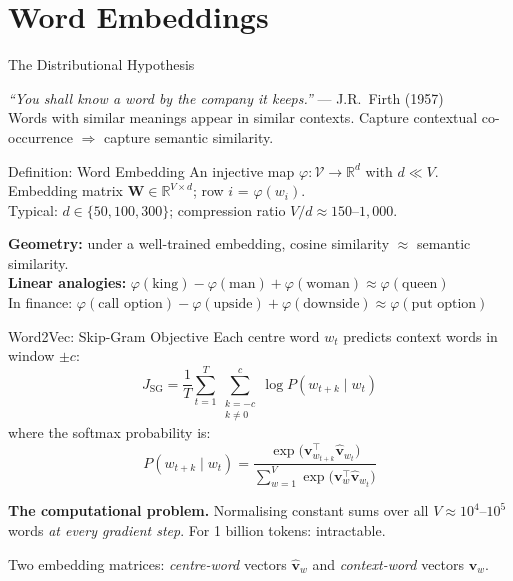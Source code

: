 \documentclass[9pt,t]{beamer}
\begin{document}
\section{Word Embeddings}

\begin{frame}{The Distributional Hypothesis}
  \begin{bigpicture}
    \emph{``You shall know a word by the company it keeps.''} --- J.R.\ Firth (1957)\\[2pt]
    Words with similar meanings appear in similar contexts.
    Capture contextual co-occurrence $\Rightarrow$ capture semantic similarity.
  \end{bigpicture}
  \medskip
  \begin{block}{Definition: Word Embedding}
    An injective map $\varphi : \mathcal{V} \to \mathbb{R}^d$ with $d \ll V$.\\
    Embedding matrix $\mathbf{W} \in \mathbb{R}^{V \times d}$;
    row $i$ = $\varphi(w_i)$.\\
    Typical: $d \in \{50, 100, 300\}$; compression ratio $V/d \approx 150$--$1{,}000$.
  \end{block}
  \medskip
  \textbf{Geometry:} under a well-trained embedding, cosine similarity $\approx$ semantic similarity.\\
  \textbf{Linear analogies:} $\varphi(\text{king}) - \varphi(\text{man}) + \varphi(\text{woman})
  \approx \varphi(\text{queen})$\\
  In finance: $\varphi(\text{call option}) - \varphi(\text{upside}) + \varphi(\text{downside})
  \approx \varphi(\text{put option})$
\end{frame}

\begin{frame}{Word2Vec: Skip-Gram Objective}
  Each centre word $w_t$ predicts context words in window $\pm c$:
  \[
    J_{\mathrm{SG}}
    = \frac{1}{T} \sum_{t=1}^{T}
      \sum_{\substack{k=-c \\ k \neq 0}}^{c}
      \log P(w_{t+k} \mid w_t)
  \]
  where the softmax probability is:
  \[
    P(w_{t+k} \mid w_t)
    = \frac{\exp\!\bigl(\mathbf{v}_{w_{t+k}}^{\top} \hat{\mathbf{v}}_{w_t}\bigr)}
           {\sum_{w=1}^{V} \exp\!\bigl(\mathbf{v}_{w}^{\top} \hat{\mathbf{v}}_{w_t}\bigr)}
  \]
  \begin{underhood}
    \textbf{The computational problem.}
    Normalising constant sums over all $V \approx 10^4$--$10^5$ words \emph{at every gradient step}.
    For 1 billion tokens: intractable.
  \end{underhood}
  Two embedding matrices: \emph{centre-word} vectors $\hat{\mathbf{v}}_w$ and \emph{context-word} vectors $\mathbf{v}_w$.
\end{frame}
\end{document}
